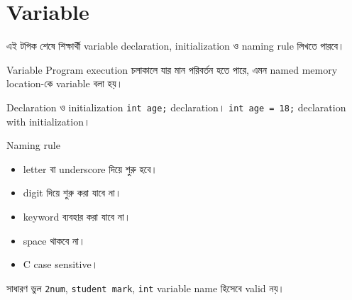 \section{Variable}

\begin{learningbox}
এই টপিক শেষে শিক্ষার্থী variable declaration, initialization ও naming rule লিখতে পারবে।
\end{learningbox}

\begin{definitionbox}{Variable}
Program execution চলাকালে যার মান পরিবর্তন হতে পারে, এমন named memory location-কে variable বলা হয়।
\end{definitionbox}

\begin{examplebox}{Declaration ও initialization}
\texttt{int age;} declaration। \texttt{int age = 18;} declaration with initialization।
\end{examplebox}

\begin{keypointbox}{Naming rule}
\begin{itemize}
\item letter বা underscore দিয়ে শুরু হবে।
\item digit দিয়ে শুরু করা যাবে না।
\item keyword ব্যবহার করা যাবে না।
\item space থাকবে না।
\item C case sensitive।
\end{itemize}
\end{keypointbox}

\begin{mistakebox}{সাধারণ ভুল}
\texttt{2num}, \texttt{student mark}, \texttt{int} variable name হিসেবে valid নয়।
\end{mistakebox}
